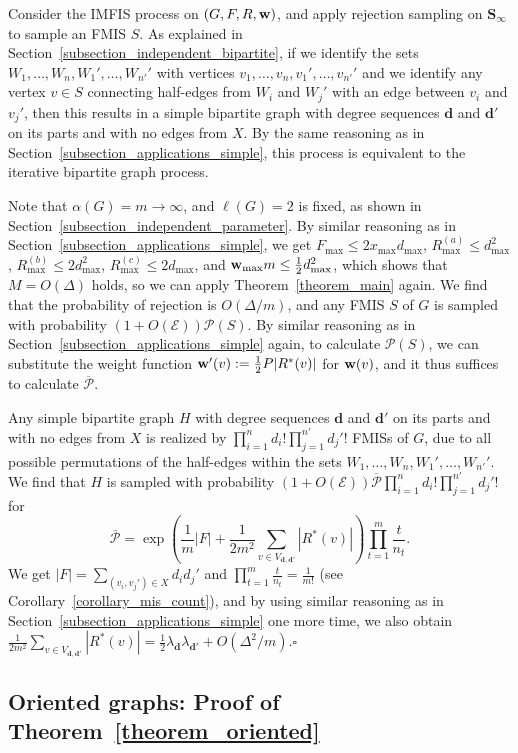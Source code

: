 \documentclass{article}
\theoremstyle{plain}
\theoremstyle{remark}
\theoremstyle{plain}
\numberwithin{equation}{section}
\renewcommand{\d}{{\boldsymbol{d}}}
\renewcommand{\b}{{\bf{w}}}
\begin{document}
	Consider the IMFIS process on $(G,F,R,\b)$, and apply rejection sampling on $\boldsymbol{S}_{\infty}$ to sample an FMIS $S$. As explained in Section~\ref{subsection_independent_bipartite}, if we identify the sets $W_1,\ldots,W_n,W_1',\ldots,W_{n'}'$ with vertices $v_1,\ldots,v_n,v_1',\ldots,v_{n'}'$ and we identify any vertex $v\in S$ connecting half-edges from $W_i$ and $W_j'$ with an edge between $v_i$ and $v_j'$, then this results in a simple bipartite graph with degree sequences $\d$ and $\d'$ on its parts and with no edges from $X$. By the same reasoning as in Section~\ref{subsection_applications_simple}, this process is equivalent to the iterative bipartite graph process.
	
	Note that $\alpha(G)=m\to\infty$, and $\ell(G)=2$ is fixed, as shown in Section~\ref{subsection_independent_parameter}. By similar reasoning as in Section~\ref{subsection_applications_simple}, we get $F_{\max}\leq2x_{\max}d_{\max}$, $R_{\max}^{(a)}\leq d_{\max}^2$, $R_{\max}^{(b)}\leq2d_{\max}^2$, $R_{\max}^{(c)}\leq2d_{\max}$, and $\b_{\max}m\leq\frac12d_{\max}^2$, which shows that $M=O(\Delta)$ holds, so we can apply Theorem~\ref{theorem_main} again. We find that the probability of rejection is $O(\Delta/m)$, and any FMIS $S$ of $G$ is sampled with probability $(1+O(\mathscr{E}))\mathscr{P}(S)$. By similar reasoning as in Section~\ref{subsection_applications_simple} again, to calculate $\mathscr{P}(S)$, we can substitute the weight function $\b'(v):=\frac12P|R^*(v)|$ for $\b(v)$, and it thus suffices to calculate $\overline{\mathscr{P}}$.
	
	Any simple bipartite graph $H$ with degree sequences $\d$ and $\d'$ on its parts and with no edges from $X$ is realized by $\prod_{i=1}^{n}d_i!\prod_{j=1}^{n'}d_j'!$ FMISs of $G$, due to all possible permutations of the half-edges within the sets $W_1,\ldots,W_n,W_1',\ldots,W_{n'}'$. We find that $H$ is sampled with probability $(1+O(\mathscr{E}))\overline{\mathscr{P}}\prod_{i=1}^{n}d_i!\prod_{j=1}^{n'}d_j'!$ for $$\overline{\mathscr{P}}=\exp\left(\frac1{m}|F|+\frac1{2m^2}\sum_{v\in V_{\d,\d'}}|R^*(v)|\right)\prod_{t=1}^{m}\frac{t}{n_t}.$$ We get $|F|=\sum_{(v_i,v_j')\in X}d_id_j'$ and $\prod_{t=1}^{m}\frac{t}{n_t}=\frac1{m!}$ (see Corollary~\ref{corollary_mis_count}), and by using similar reasoning as in Section~\ref{subsection_applications_simple} one more time, we also obtain $\frac1{2m^2}\sum_{v\in V_{\d,\d'}}|R^*(v)|=\frac12\lambda_\d\lambda_{\d'}+O(\Delta^2/m)$.\hfill$\square$
	
	\subsection{Oriented graphs: Proof of Theorem~\ref{theorem_oriented}}\label{subsection_applications_oriented}
	
\end{document}
